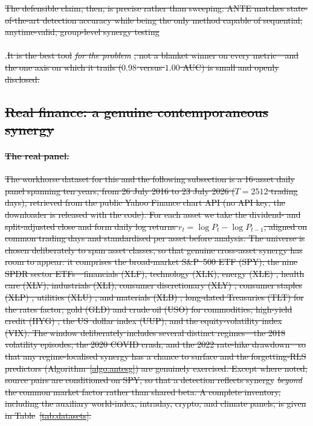 \documentclass[pdflatex,sn-mathphys-ay]{sn-jnl}%
\theoremstyle{thmstyleone}%
\theoremstyle{thmstyletwo}%
\theoremstyle{thmstylethree}%
\providecommand{\DIFadd}[1]{{\protect\color{blue}\uwave{#1}}} %
\providecommand{\DIFdel}[1]{{\protect\color{red}\sout{#1}}}                      %
\providecommand{\DIFaddbegin}{} %
\providecommand{\DIFaddend}{} %
\providecommand{\DIFdelbegin}{} %
\providecommand{\DIFdelend}{} %
\newcommand{\DIFscaledelfig}{0.5}
\newlength{\DIFdelgraphicswidth} %
\newlength{\DIFdelgraphicsheight} %
\newcommand{\DIFaddincludegraphics}[2][]{{\color{blue}\fbox{\DIFOincludegraphics[#1]{#2}}}} %
\newcommand{\DIFdelincludegraphics}[2][]{%
\sbox{\DIFdelgraphicsbox}{\DIFOincludegraphics[#1]{#2}}%
\settoboxwidth{\DIFdelgraphicswidth}{\DIFdelgraphicsbox} %
\settoboxtotalheight{\DIFdelgraphicsheight}{\DIFdelgraphicsbox} %
\scalebox{\DIFscaledelfig}{%
\parbox[b]{\DIFdelgraphicswidth}{\usebox{\DIFdelgraphicsbox}\\[-\baselineskip] \rule{\DIFdelgraphicswidth}{0em}}\llap{\resizebox{\DIFdelgraphicswidth}{\DIFdelgraphicsheight}{%
\setlength{\unitlength}{\DIFdelgraphicswidth}%
\begin{picture}(1,1)%
\thicklines\linethickness{2pt} %
{\color[rgb]{1,0,0}\put(0,0){\framebox(1,1){}}}%
{\color[rgb]{1,0,0}\put(0,0){\line( 1,1){1}}}%
{\color[rgb]{1,0,0}\put(0,1){\line(1,-1){1}}}%
\end{picture}%
}\hspace*{3pt}}} %
} %
\DeclareRobustCommand{\DIFaddbegin}{\DIFOaddbegin \let\includegraphics\DIFaddincludegraphics} %
\DeclareRobustCommand{\DIFaddend}{\DIFOaddend \let\includegraphics\DIFOincludegraphics} %
\DeclareRobustCommand{\DIFdelbegin}{\DIFOdelbegin \let\includegraphics\DIFdelincludegraphics} %
\DeclareRobustCommand{\DIFdelend}{\DIFOaddend \let\includegraphics\DIFOincludegraphics} %
\begin{document}
\DIFdelbegin \DIFdel{The defensible claim, then, is precise rather than sweeping: ANTE matches
state-of-the-art detection accuracy while being the only method capable of sequential, anytime-valid, group-level synergy testing}\DIFdelend \DIFaddbegin \paragraph{\DIFadd{Results.}} \DIFadd{Table~\ref{tab:scan} summarises the search and Fig}\DIFaddend .\DIFdelbegin \DIFdel{It is the best tool
}\emph{\DIFdel{for the problem}}%
\DIFdel{, not a blanket winner on every metric---and the one axis on
which it trails ($0.98$ versus $1.00$ AUC) is small and openly disclosed.
}%

\subsection{\DIFdel{Real finance: a genuine contemporaneous synergy}}%
\addtocounter{subsection}{-1}%

\paragraph{\DIFdel{The real panel.}} %
\addtocounter{paragraph}{-1}%
\DIFdel{The workhorse dataset for this and the following
subsection is a 16-asset daily panel spanning ten years, from 26 July 2016 to 23
July 2026 ($T=2512$ trading days), retrieved from the public Yahoo Finance chart
API (no API key; the downloader is released with the code). For each asset we take
the dividend- and split-adjusted close and form daily log returns
$r_{t}=\log P_{t}-\log P_{t-1}$, aligned on common trading days and standardised
per asset before analysis. The universe is chosen deliberately to span asset
classes, so that genuine cross-asset synergy has room to appear: it comprises the broad-market S\&P~500 ETF (SPY); the nine SPDR sector ETFs---financials (XLF),
technology (XLK), energy (XLE) , health care (XLV), industrials (XLI), consumer
discretionary (XLY) , consumer staples (XLP) , utilities (XLU) , and
materials
(XLB) ; long-dated Treasuries (TLT) for the rates factor; gold (GLD) and crude oil
(USO)
for commodities; high-yield credit (HYG) ; the US~dollar index (UUP); and the
equity-volatility index (VIX). The window deliberately includes several distinct
regimes---the 2018 volatility episodes, the 2020 COVID crash, and the 2022 rate-hike
drawdown---so that any regime-localised synergy has a chance to surface and the
forgetting-RLS predictors (Algorithm~\ref{algo:antesg}) are genuinely exercised. Except where noted, source pairs are conditioned on SPY, so that a detection
reflects synergy }\emph{\DIFdel{beyond}} %
\DIFdel{the common market factor rather than shared beta.
A complete inventory, including the auxiliary world-index, intraday, crypto, and
climate panels, is given in Table}\DIFdelend ~\DIFdelbegin \DIFdel{\ref{tab:datasets}.
}%
\end{document}
